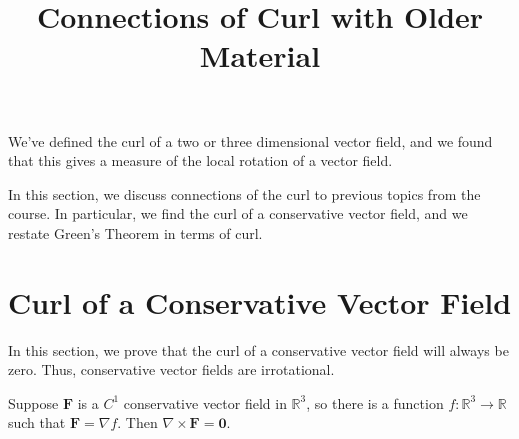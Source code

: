 \documentclass{ximera}
\title{Connections of Curl with Older Material}
\begin{document}
  
\begin{abstract}  
\end{abstract}  
\maketitle 

We've defined the curl of a two or three dimensional vector field, and we found that this gives a measure of the local rotation of a vector field.

In this section, we discuss connections of the curl to previous topics from the course. In particular, we find the curl of a conservative vector field, and we restate Green's Theorem in terms of curl.

\section{Curl of a Conservative Vector Field}

In this section, we prove that the curl of a conservative vector field will always be zero. Thus, conservative vector fields are irrotational.

\begin{theorem}
Suppose $\mathbf{F}$ is a $C^1$ conservative vector field in $\mathbb{R}^3$, so there is a function $f:\mathbb{R}^3\rightarrow\mathbb{R}$ such that $\mathbf{F}=\nabla f$. Then $\nabla\times\mathbf{F} = \mathbf{0}$.
\end{theorem}
\end{document}
